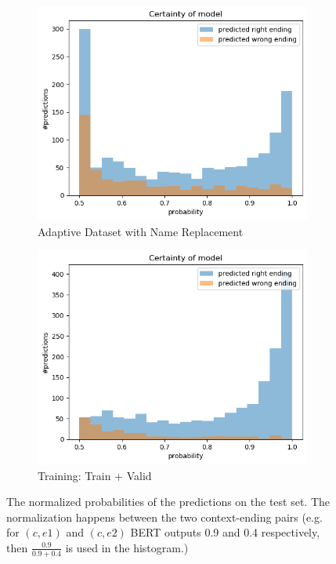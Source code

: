 \documentclass{article}
\begin{document}
\begin{figure}[h]
	\begin{subfigure}[b]{.45\linewidth}
		\centering
		\includegraphics[width=\linewidth]{test_results_converted_t.png}
		\caption{Adaptive Dataset with Name Replacement}
	\end{subfigure}\hfill
	\begin{subfigure}[b]{.45\linewidth}
		\centering
		\includegraphics[width=\linewidth]{test_results_converted_tv.png}
		\caption{Training: Train + Valid}
	\end{subfigure}
	\caption{The normalized probabilities of the predictions on the test set. The normalization happens between the two context-ending pairs (e.g. for $(c,e1)$ and $(c,e2)$ BERT outputs 0.9 and 0.4 respectively, then $\frac{0.9}{0.9+0.4}$ is used in the histogram.)}\label{distribution1}
\end{figure}
\end{document}
